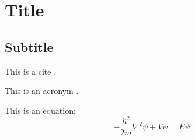 \clearpage
\section{Title}
\lipsum[1-2] %
\subsection{Subtitle}
\lipsum[3-4] %

This is a cite \parencite{Einstein1916}.

This is an acronym .

This is an equation:
\begin{equation}
   -\frac{\hbar^2}{2m}\nabla^2\psi + V\psi = E\psi
\end{equation}